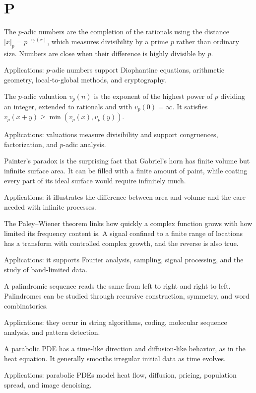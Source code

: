 \chapter*{P}
\label{chap:p}

The $p$-adic numbers are the completion of the rationals using the distance $|x|_p=p^{-v_p(x)}$, which measures divisibility by a prime $p$ rather than ordinary size. Numbers are close when their difference is highly divisible by $p$. \par\noindent Applications: $p$-adic numbers support Diophantine equations, arithmetic geometry, local-to-global methods, and cryptography.

The $p$-adic valuation $v_p(n)$ is the exponent of the highest power of $p$ dividing an integer, extended to rationals and with $v_p(0)=\infty$. It satisfies $v_p(x+y)\geq\min(v_p(x),v_p(y))$. \par\noindent Applications: valuations measure divisibility and support congruences, factorization, and $p$-adic analysis.

Painter's paradox is the surprising fact that Gabriel's horn has finite volume but infinite surface area. It can be filled with a finite amount of paint, while coating every part of its ideal surface would require infinitely much. \par\noindent Applications: it illustrates the difference between area and volume and the care needed with infinite processes.

The Paley--Wiener theorem links how quickly a complex function grows with how limited its frequency content is. A signal confined to a finite range of locations has a transform with controlled complex growth, and the reverse is also true. \par\noindent Applications: it supports Fourier analysis, sampling, signal processing, and the study of band-limited data.

A palindromic sequence reads the same from left to right and right to left. Palindromes can be studied through recursive construction, symmetry, and word combinatorics. \par\noindent Applications: they occur in string algorithms, coding, molecular sequence analysis, and pattern detection.

A parabolic PDE has a time-like direction and diffusion-like behavior, as in the heat equation. It generally smooths irregular initial data as time evolves. \par\noindent Applications: parabolic PDEs model heat flow, diffusion, pricing, population spread, and image denoising.

